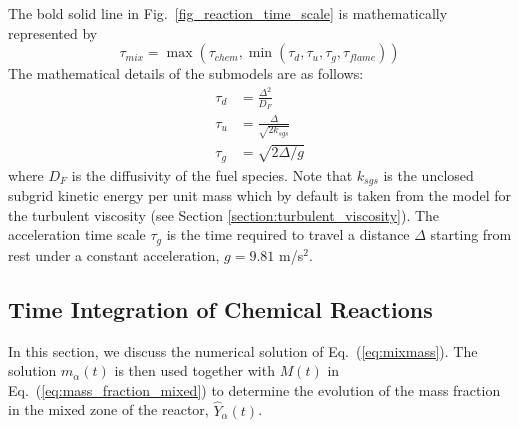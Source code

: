 The bold solid line in Fig.~\ref{fig_reaction_time_scale} is mathematically represented by
\begin{equation}
\label{eqn_tau_mix}
\tau_{mix} = \max(\tau_{chem},\min(\tau_d,\tau_u,\tau_g,\tau_{flame}))
\end{equation}
The mathematical details of the submodels are as follows:
\begin{align}
\label{eq:tau_diff} \tau_{d} &= \frac{\Delta^2}{D_F} \\
\label{eq:tau_sgs}  \tau_{u} &= \frac{\Delta}{\sqrt{2k_{sgs}}} \\
\label{eqn_tau_grav}\tau_{g} &= \sqrt{ 2\Delta/g }
\end{align}
where $D_F$ is the diffusivity of the fuel species. Note that $k_{sgs}$ is the unclosed subgrid kinetic energy per unit mass which by default is taken from the model for the turbulent viscosity (see Section \ref{section:turbulent_viscosity}). The acceleration time scale $\tau_{g}$ is the time required to travel a distance $\Delta$ starting from rest under a constant acceleration, $g=9.81$ m/s$^2$.


\subsection{Time Integration of Chemical Reactions}
\label{sec:reac_time_integration}

In this section, we discuss the numerical solution of Eq.~(\ref{eq:mixmass}).  The solution $m_\alpha(t)$ is then used together with $M(t)$ in Eq.~(\ref{eq:mass_fraction_mixed}) to determine the evolution of the mass fraction in the mixed zone of the reactor, $\hat{Y}_\alpha(t)$.

